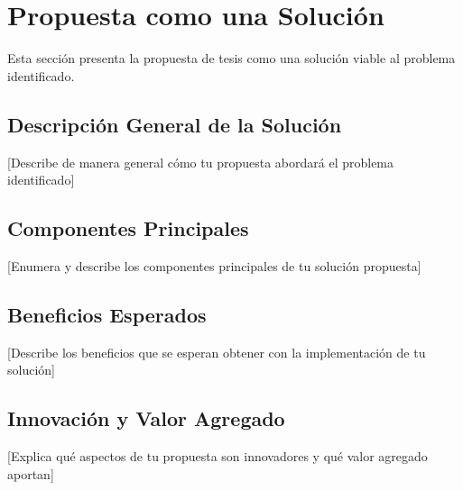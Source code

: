 \section{Propuesta como una Solución}

Esta sección presenta la propuesta de tesis como una solución viable al problema identificado.

\subsection{Descripción General de la Solución}
[Describe de manera general cómo tu propuesta abordará el problema identificado]

\subsection{Componentes Principales}
[Enumera y describe los componentes principales de tu solución propuesta]

\subsection{Beneficios Esperados}
[Describe los beneficios que se esperan obtener con la implementación de tu solución]

\subsection{Innovación y Valor Agregado}
[Explica qué aspectos de tu propuesta son innovadores y qué valor agregado aportan]